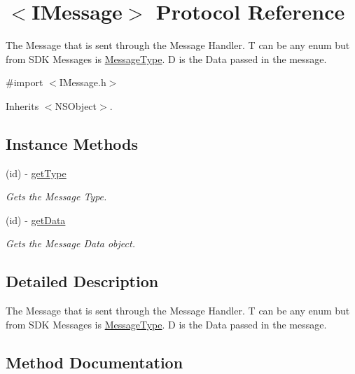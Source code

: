 \hypertarget{protocol_i_message-p}{}\section{$<$I\+Message$>$ Protocol Reference}
\label{protocol_i_message-p}


The Message that is sent through the Message Handler. T can be any enum but from S\+D\+K Messages is \hyperlink{interface_message_type}{Message\+Type}. D is the Data passed in the message.  




{\ttfamily \#import $<$I\+Message.\+h$>$}



Inherits $<$\+N\+S\+Object$>$.

\subsection*{Instance Methods}
\begin{DoxyCompactItemize}
\item 
(id) -\/ \hyperlink{protocol_i_message-p_a8feeee5a59bc468b18075f097d95275e}{get\+Type}
\begin{DoxyCompactList}\small\item\em Gets the Message Type. \end{DoxyCompactList}\item 
(id) -\/ \hyperlink{protocol_i_message-p_a6f4c6461c4ba890934cb6de505cd4710}{get\+Data}
\begin{DoxyCompactList}\small\item\em Gets the Message Data object. \end{DoxyCompactList}\end{DoxyCompactItemize}


\subsection{Detailed Description}
The Message that is sent through the Message Handler. T can be any enum but from S\+D\+K Messages is \hyperlink{interface_message_type}{Message\+Type}. D is the Data passed in the message. 

\subsection{Method Documentation}
\hypertarget{protocol_i_message-p_a6f4c6461c4ba890934cb6de505cd4710}{}
